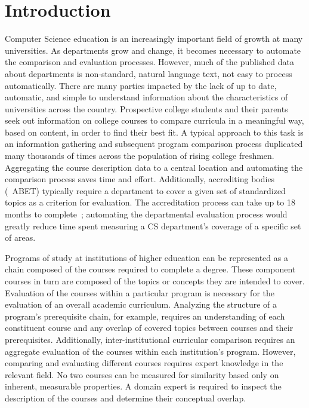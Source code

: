 \section{Introduction}
\label{sec:introduction}


Computer Science education is an increasingly important field of growth at many universities.
As departments grow and change, it becomes necessary to automate the comparison and evaluation processes.
However, much of the published data about departments is non-standard, natural language text, not easy to process automatically.
There are many parties impacted by the lack of up to date, automatic, and simple to understand information about the characteristics of universities across the country.
Prospective college students and their parents seek out information on college courses to compare curricula in a meaningful way, based on content, in order to find their best fit.
A typical approach to this task is an information gathering and subsequent program comparison process duplicated many thousands of times across the population of rising college freshmen.
Aggregating the course description data to a central location and automating the comparison process saves time and effort.
Additionally, accrediting bodies (\eg\ ABET) typically require a department to cover a given set of standardized topics as a criterion for evaluation.
The accreditation process can take up to 18 months to complete~\cite{ABET2015}; automating the departmental evaluation process would greatly reduce time spent measuring a CS department's coverage of a specific set of areas.


Programs of study at institutions of higher education can be represented as a chain composed of the courses required to complete a degree.
These component courses in turn are composed of the topics or concepts they are intended to cover.
Evaluation of the courses within a particular program is necessary for the evaluation of an overall academic curriculum.
Analyzing the structure of a program's prerequisite chain, for example, requires an understanding of each constituent course and any overlap of covered topics between courses and their prerequisites.
Additionally, inter-institutional curricular comparison requires an aggregate evaluation of the courses within each institution's program.
However, comparing and evaluating different courses requires expert knowledge in the relevant field.
No two courses can be measured for similarity based only on inherent, measurable properties.
A domain expert is required to inspect the description of the courses and determine their conceptual overlap.


